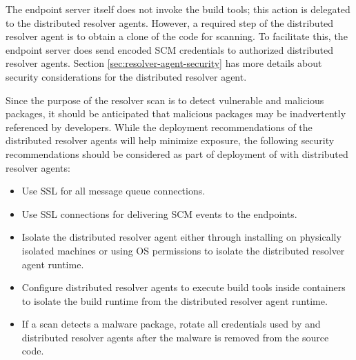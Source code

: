 The \cxoneflow endpoint server itself does not invoke the build tools; this action is
delegated to the distributed resolver agents.  However, a required step of the
distributed resolver agent is to obtain a clone of the code for scanning.  To facilitate this,
the \cxoneflow endpoint server does send encoded SCM credentials to authorized
distributed resolver agents.  Section \ref{sec:resolver-agent-security} has more details
about security considerations for the distributed resolver agent.

Since the purpose of the resolver scan is to detect vulnerable and malicious packages,
it should be anticipated that malicious packages may be inadvertently referenced
by developers.  While the deployment recommendations of the distributed resolver agents
will help minimize exposure, the following security recommendations should be considered
as part of deployment of \cxoneflow with distributed resolver agents:

\begin{itemize}
  \item Use SSL for all message queue connections.
  \item Use SSL connections for delivering SCM events to the \cxoneflow endpoints.
  \item Isolate the distributed resolver agent either through installing on physically isolated machines or
  using OS permissions to isolate the distributed resolver agent runtime.
  \item Configure distributed resolver agents to execute build tools inside containers to isolate the build runtime from
  the distributed resolver agent runtime.
  \item If a scan detects a malware package, rotate all credentials used by \cxoneflow and distributed resolver agents
  after the malware is removed from the source code.
\end{itemize}





